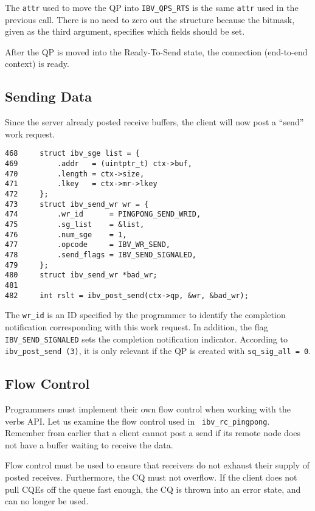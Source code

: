 \documentclass[letterpaper,12pt]{article}
\begin{document}
The {\tt attr} used to move the QP into {\tt IBV\_QPS\_RTS} is the same
{\tt attr} used in the previous call. There is no need to zero out the
structure because the bitmask, given as the third argument, specifies which
fields should be set.

After the QP is moved into the Ready-To-Send state, the connection
(end-to-end context) is ready.

\subsection{Sending Data}
Since the server already posted receive buffers, the client will now
post a ``send'' work request.

\lstset{language=C, caption=Client Posting Send}
\begin{lstlisting}
468     struct ibv_sge list = {
469         .addr   = (uintptr_t) ctx->buf,
470         .length = ctx->size,
471         .lkey   = ctx->mr->lkey
472     };
473     struct ibv_send_wr wr = {
474         .wr_id      = PINGPONG_SEND_WRID,
475         .sg_list    = &list,
476         .num_sge    = 1,
477         .opcode     = IBV_WR_SEND,
478         .send_flags = IBV_SEND_SIGNALED,
479     };
480     struct ibv_send_wr *bad_wr;
481
482     int rslt = ibv_post_send(ctx->qp, &wr, &bad_wr);
\end{lstlisting}

The {\tt wr\_id} is an ID specified by the programmer to identify the
completion notification corresponding with this work request. In addition,
the flag {\tt IBV\_SEND\_SIGNALED} sets the completion notification
indicator. According to {\tt ibv\_post\_send (3)}, it is only relevant
if the QP is created with {\tt sq\_sig\_all = 0}.

\subsection{Flow Control}

Programmers must implement their own flow control when working
with the verbs API. Let us examine the flow control used in {\tt
ibv\_rc\_pingpong}. Remember from earlier that a client cannot post a send
if its remote node does not have a buffer waiting to receive the data.

Flow control must be used to ensure that receivers do not exhaust their
supply of posted receives. Furthermore, the CQ must not overflow. If the
client does not pull CQEs off the queue fast enough, the CQ is thrown
into an error state, and can no longer be used.
\end{document}

